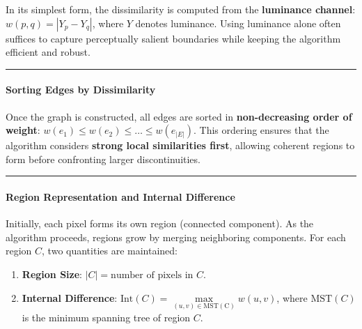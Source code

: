 \documentclass[11pt]{article}
\providecommand{\tightlist}{%
      \setlength{\itemsep}{0pt}\setlength{\parskip}{0pt}}
\begin{document}
In its simplest form, the dissimilarity is computed from the
\textbf{luminance channel}: \(w(p,q) = |Y_p - Y_q|\), where \(Y\)
denotes luminance. Using luminance alone often suffices to capture
perceptually salient boundaries while keeping the algorithm efficient
and robust.

\begin{center}\rule{0.5\linewidth}{0.5pt}\end{center}

\hypertarget{sorting-edges-by-dissimilarity}{%
\paragraph{\texorpdfstring{\textbf{Sorting Edges by
Dissimilarity}}{Sorting Edges by Dissimilarity}}\label{sorting-edges-by-dissimilarity}}

Once the graph is constructed, all edges are sorted in
\textbf{non-decreasing order of weight}:
\(w(e_1) \le w(e_2) \le \dots \le w(e_{|E|})\). This ordering ensures
that the algorithm considers \textbf{strong local similarities first},
allowing coherent regions to form before confronting larger
discontinuities.

\begin{center}\rule{0.5\linewidth}{0.5pt}\end{center}

\hypertarget{region-representation-and-internal-difference}{%
\paragraph{\texorpdfstring{\textbf{Region Representation and Internal
Difference}}{Region Representation and Internal Difference}}\label{region-representation-and-internal-difference}}

Initially, each pixel forms its own region (connected component). As the
algorithm proceeds, regions grow by merging neighboring components. For
each region \(C\), two quantities are maintained:

\begin{enumerate}
\def\labelenumi{\arabic{enumi}.}
\tightlist
\item
  \textbf{Region Size}: \(|C| = \text{number of pixels in } C\).
\item
  \textbf{Internal Difference}:
  \(\mathrm{Int}(C) = \underset{(u,v)\in \mathrm{MST(C)}}{\max} w(u,v)\),
  where \(\mathrm{MST}(C)\) is the minimum spanning tree of region
  \(C\).
\end{enumerate}
\end{document}
